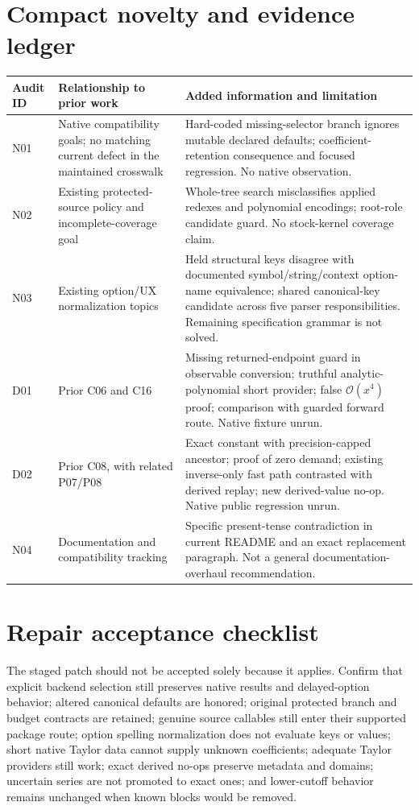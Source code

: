 \documentclass[11pt,letterpaper]{article}
\newcommand{\code}[1]{\texttt{\detokenize{#1}}}
\newcommand{\OO}{\mathcal O}
\begin{document}
\appendix
\section{Compact novelty and evidence ledger}

\begin{longtable}{@{}P{0.7in}P{1.65in}P{3.91in}@{}}
\toprule
Audit ID & Relationship to prior work & Added information and limitation\\\midrule\endhead
N01 & Native compatibility goals; no matching current defect in the maintained crosswalk & Hard-coded missing-selector branch ignores mutable declared defaults; coefficient-retention consequence and focused regression. No native observation.\\
N02 & Existing protected-source policy and incomplete-coverage goal & Whole-tree \code{Function} search misclassifies applied redexes and \code{Root} polynomial encodings; root-role candidate guard. No stock-kernel coverage claim.\\
N03 & Existing option/UX normalization topics & Held structural keys disagree with documented symbol/string/context option-name equivalence; shared canonical-key candidate across five parser responsibilities. Remaining specification grammar is not solved.\\
D01 & Prior C06 and C16 & Missing returned-endpoint guard in observable conversion; truthful analytic-polynomial short provider; false $\OO(x^4)$ proof; comparison with guarded forward route. Native fixture unrun.\\
D02 & Prior C08, with related P07/P08 & Exact constant with precision-capped ancestor; proof of zero demand; existing inverse-only fast path contrasted with derived replay; new derived-value no-op. Native public regression unrun.\\
N04 & Documentation and compatibility tracking & Specific present-tense contradiction in current README and an exact replacement paragraph. Not a general documentation-overhaul recommendation.\\
\bottomrule
\end{longtable}

\section{Repair acceptance checklist}

The staged patch should not be accepted solely because it applies. Confirm that explicit backend selection still preserves native results and delayed-option behavior; altered canonical defaults are honored; original protected branch and budget contracts are retained; genuine source callables still enter their supported package route; option spelling normalization does not evaluate keys or values; short native Taylor data cannot supply unknown coefficients; adequate Taylor providers still work; exact derived no-ops preserve metadata and domains; uncertain series are not promoted to exact ones; and lower-cutoff behavior remains unchanged when known blocks would be removed.
\end{document}
